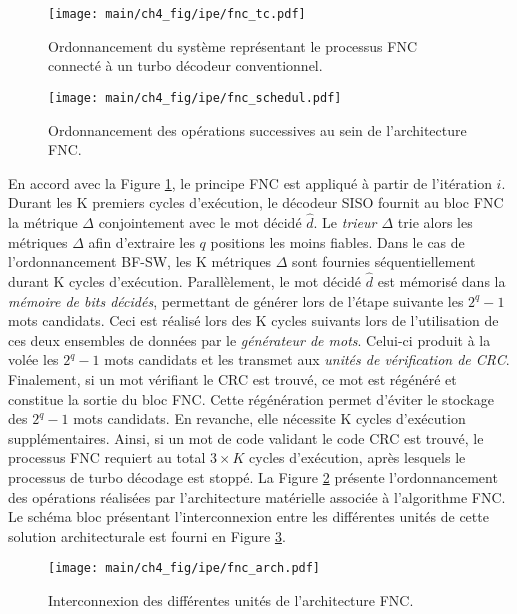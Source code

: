 \begin{figure}[!t]
	\centering
	\texttt{[image: main/ch4\_fig/ipe/fnc\_tc.pdf]}
	\caption{Ordonnancement du système représentant le processus FNC connecté à un turbo décodeur conventionnel. 
	\label{fig:fnc_tc}}
\end{figure}

\begin{figure}[!b]
	\centering
	\texttt{[image: main/ch4\_fig/ipe/fnc\_schedul.pdf]}
	\caption{Ordonnancement des opérations successives au sein de l'architecture FNC. \label{fig:fnc_schedul}}
\end{figure}

En accord avec la Figure \ref{fig:fnc_tc}, le principe FNC est appliqué à partir de l'itération $i$. Durant les K 
premiers cycles d'exécution, le 
décodeur SISO fournit au bloc FNC la métrique $\Delta$ conjointement avec le mot décidé $\hat{d}$. Le \textit{trieur 
$\Delta$} trie alors les métriques $\Delta$ afin d'extraire les $q$ positions les moins fiables. Dans le cas de 
l’ordonnancement BF-SW, les K métriques $\Delta$ sont fournies séquentiellement durant K cycles d'exécution. Parallèlement, 
le mot décidé $\hat{d}$ est mémorisé dans la \textit{mémoire de bits décidés}, permettant de générer lors de 
l'étape suivante les $2^q-1$ mots candidats. Ceci est réalisé lors des K cycles suivants lors de l'utilisation de ces 
deux ensembles de données par le \textit{générateur de mots}. Celui-ci produit à la volée les 
$2^q-1$ mots candidats et les transmet aux \textit{unités de vérification de CRC}. Finalement, si un mot 
vérifiant le CRC est trouvé, ce mot est régénéré et constitue la sortie du bloc FNC. Cette régénération permet d'éviter 
le stockage des $2^q-1$ mots candidats. En revanche, elle nécessite K cycles d'exécution supplémentaires. Ainsi, si un mot de code validant le
code CRC est trouvé, le processus FNC requiert au total $3\times K$ cycles d'exécution, après lesquels le processus de 
turbo décodage est stoppé. La Figure \ref{fig:fnc_schedul} présente l'ordonnancement des opérations 
réalisées par l'architecture matérielle associée à l'algorithme FNC. Le schéma bloc présentant l'interconnexion entre les 
différentes unités de cette solution architecturale est fourni en Figure \ref{fig:fnc_arch}. 

\begin{figure}[!t]
	\centering
	\texttt{[image: main/ch4\_fig/ipe/fnc\_arch.pdf]}
	\caption{Interconnexion des différentes unités de l'architecture FNC. \label{fig:fnc_arch}}
\end{figure}

